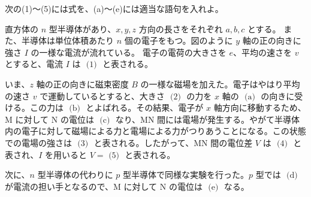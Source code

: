 \hakosyokika
\item
    \begin{mawarikomi}{150pt}{
        
    }
次の(1)〜(5)には式を、(a)〜(e)には適当な語句を入れよ。

直方体の $n$ 型半導体があり、$x, y, z$ 方向の長さをそれぞれ $a, b, c$ とする。
また、半導体は単位体積あたり $n$ 個の電子をもつ。図のように $y$ 軸の正の向きに強さ $I$ の一様な電流が流れている。
電子の電荷の大きさを $e$、平均の速さを $v$ とすると、電流 $I$ は $\boxed{\text{ (1) }}$ と表される。

いま、$z$ 軸の正の向きに磁束密度 $B$ の一様な磁場を加えた。電子はやはり平均の速さ $v$ で運動しているとすると、大きさ $\boxed{\text{ (2) }}$ の力を $x$ 軸の $\boxed{\text{ (a) }}$ の向きに受ける。この力は $\boxed{\text{ (b) }}$ とよばれる。その結果、電子が $x$ 軸方向に移動するため、$\mathrm{M}$ に対して $\mathrm{N}$ の電位は $\boxed{\text{ (c) }}$ なり、$\mathrm{MN}$ 間には電場が発生する。やがて半導体内の電子に対して磁場による力と電場による力がつりあうことになる。この状態での電場の強さは $\boxed{\text{ (3) }}$ と表される。したがって、$\mathrm{MN}$ 間の電位差 $V$ は $\boxed{\text{ (4) }}$ と表され、$I$ を用いると $V=\boxed{\text{ (5) }}$ と表される。

次に、$n$ 型半導体の代わりに $p$ 型半導体で同様な実験を行った。$p$ 型では $\boxed{\text{ (d) }}$ が電流の担い手となるので、$\mathrm{M}$ に対して $\mathrm{N}$ の電位は $\boxed{\text{ (e) }}$ なる。

\end{mawarikomi}
